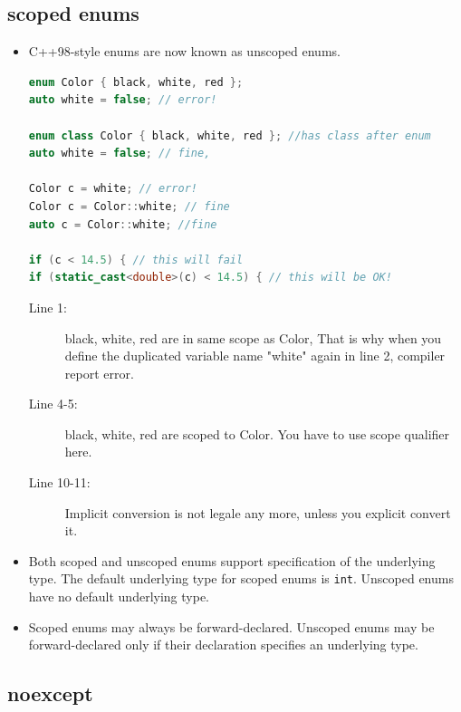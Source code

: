 \documentclass[a4paper,11pt,twoside]{book}
\begin{document}
\subsection{scoped enums}
\begin{itemize}
	\item C++98-style enums are now known as unscoped enums.
\begin{lstlisting}[frame=single, language=c++]
enum Color { black, white, red };
auto white = false; // error! 

enum class Color { black, white, red }; //has class after enum
auto white = false; // fine, 

Color c = white; // error!
Color c = Color::white; // fine
auto c = Color::white; //fine

if (c < 14.5) { // this will fail 
if (static_cast<double>(c) < 14.5) { // this will be OK! 
\end{lstlisting}
\begin{description}
	\item[Line 1:] black, white, red are in same scope as Color, That is why when you define the duplicated variable name "white" again in line 2, compiler report error.
	\item[Line 4-5:]black, white, red are scoped to Color. You have to use scope qualifier here.
    \item[Line 10-11:] Implicit conversion is not legale any more, unless you explicit convert it.
\end{description}

\item Both scoped and unscoped enums support specification of the underlying type.  The default underlying type for scoped enums is \texttt{int}. Unscoped enums have no default underlying type.

\item Scoped enums may always be forward-declared. Unscoped enums may be forward-declared only if their declaration specifies an underlying type.

\end{itemize}

\subsection{noexcept}
\end{document}
